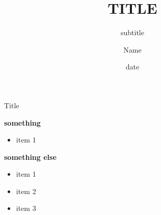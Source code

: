 \documentclass[handout,compress]{beamer}
\title{TITLE}
\subtitle{subtitle}
\author{Name}
\date{date}
\newcommand{\vs}{\vspace*{0.05in}}
\begin{document}
\begin{frame}
	\maketitle
\end{frame}

\begin{frame}{Title}

\textbf{something}

	\begin{itemize}
	\item item 1
	\vfill
	\end{itemize}
	\textbf{something else}
	\begin{itemize}
		\item item 1
		\vs
		\item item 2
		\vs
		\item item 3
		\vfill
	\end{itemize}
\end{frame}
\end{document}
